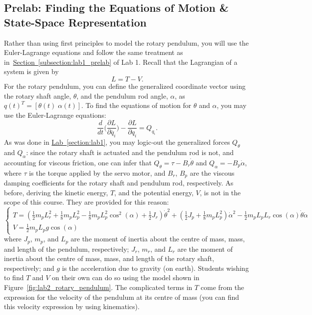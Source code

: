 \documentclass[12pt]{report}
\begin{document}
\subsection{Prelab: Finding the Equations of Motion \& State-Space Representation}\label{subsection:lab2_prelab}
Rather than using first principles to model the rotary pendulum, you will use the Euler-Lagrange equations and follow the same treatment as in~\hyperref[subsection:lab1_prelab]{Section~\ref{subsection:lab1_prelab}} of Lab 1. Recall that the Lagrangian of a system is given by
\[
    L=T-V.
\]
For the rotary pendulum, you can define the generalized coordinate vector using the rotary shaft angle, $\theta$, and the pendulum rod angle, $\alpha$, as $q(t)^T=[\theta(t) \; \alpha(t)]$. To find the equations of motion for $\theta$ and $\alpha$, you may use the Euler-Lagrange equations:
\begin{equation*}\label{equation:lab2_lagrange_equns}
    \frac{d}{dt} \Bigg(\frac{\partial L}{\partial \dot{q_i}}\Bigg)  - \frac{\partial L}{\partial q_i} = Q_{q_i}.
\end{equation*}
As was done in \hyperref[section:lab1]{Lab~\ref{section:lab1}}, you may logic-out the generalized forces $Q_\theta$ and $Q_\alpha$: since the rotary shaft is actuated and the pendulum rod is not, and accounting for viscous friction, one can infer that $Q_\theta = \tau - B_r \dot{\theta} $ and $Q_\alpha = -B_p \dot{\alpha}$, where $\tau$ is the torque applied by the servo motor, and $B_r$, $B_p$ are the viscous damping coefficients for the rotary shaft and pendulum rod, respectively. As before, deriving the kinetic energy, $T$, and the potential energy, $V$, is not in the scope of this course. They are provided for this reason:
\begin{equation*}
    \begin{cases}
        T = \left(\frac{1}{2} m_p L_{r}^2 + \frac{1}{8} m_p L_{p}^2 - \frac{1}{8} m_p L_{p}^2 \cos^2(\alpha) + \frac{1}{2} J_r\right) \dot{\theta}^2 + \left(\frac{1}{2} J_p + \frac{1}{8} m_p L_{p}^2 \right) \dot{\alpha}^2 - \frac{1}{2} m_p L_p L_r \cos(\alpha) \dot{\theta} \dot{\alpha} \\
        V = \frac{1}{2} m_p L_p g \cos(\alpha)
    \end{cases}
\end{equation*}
where $J_p$, $m_p$, and $L_p$ are the moment of inertia about the centre of mass, mass, and length of the pendulum, respectively; $J_r$, $m_r$, and $L_r$ are the moment of inertia about the centre of mass, mass, and length of the rotary shaft, respectively; and $g$ is the acceleration due to gravity (on earth). Students wishing to find $T$ and $V$ on their own can do so using the model shown in Figure~\ref{fig:lab2_rotary_pendulum}. The complicated terms in $T$ come from the expression for the velocity of the pendulum at its centre of mass (you can find this velocity expression by using kinematics).
\end{document}
